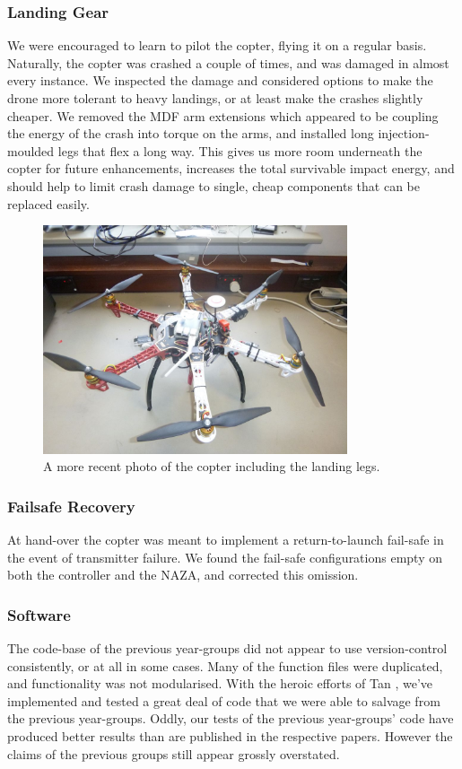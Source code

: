 \documentclass[a4paper, 11pt, titlepage]{article}
\begin{document}
    \subsubsection{Landing Gear}
      We were encouraged to learn to pilot the copter, flying it on a regular basis.  Naturally, the copter was crashed a couple of times, and was damaged in almost every instance.  We inspected the damage and considered options to make the drone more tolerant to heavy landings, or at least make the crashes slightly cheaper.
      We removed the MDF arm extensions which appeared to be coupling the energy of the crash into torque on the arms, and installed long injection-moulded legs that flex a long way. This gives us more room underneath the copter for future enhancements, increases the total survivable impact energy, and should help to limit crash damage to single, cheap components that can be replaced easily.
      \begin{figure}[h!]
        \centering
        \includegraphics[width=0.8\textwidth]{LandingGear.jpg}
        \caption{A more recent photo of the copter including the landing legs.}
      \end{figure}

    \subsubsection{Failsafe Recovery}
      At hand-over the copter was meant to implement a return-to-launch fail-safe in the event of transmitter failure.  We found the fail-safe configurations empty on both the controller and the NAZA, and corrected this omission.

    \subsubsection{Software}
      The code-base of the previous year-groups did not appear to use version-control consistently, or at all in some cases.  Many of the function files were duplicated, and functionality was not modularised.
      With the heroic efforts of Tan \cite{Tan}, we've implemented and tested a great deal of code that we were able to salvage from the previous year-groups.  
      Oddly, our tests of the previous year-groups' code have produced better results than are published in the respective papers.  However the claims of the previous groups still appear grossly overstated.
\end{document}
